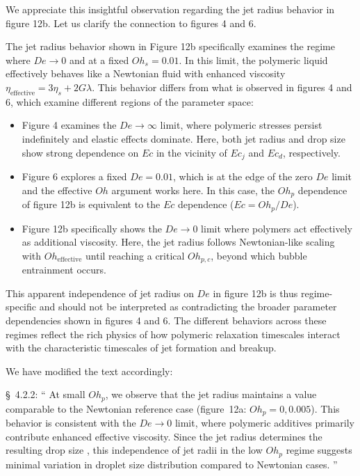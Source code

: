 \documentclass[]{article}
\newcommand{\oo}{\color{magenta} \normalfont}
\newcommand{\bb}{\color{black} \normalfont}
\begin{document}
\begin{enumerate}
      We appreciate this insightful observation regarding the jet radius behavior in figure 12b. Let us clarify the connection to figures 4 and 6.

      The jet radius behavior shown in Figure 12b specifically examines the regime where $De \to 0$ and at a fixed $Oh_s = 0.01$. In this limit, the polymeric liquid effectively behaves like a Newtonian fluid with enhanced viscosity $\eta_{\text{effective}} = 3\eta_s + 2G\lambda$. This behavior differs from what is observed in figures 4 and 6, which examine different regions of the parameter space:

      \begin{itemize}
      	\item Figure 4 examines the $De \to \infty$ limit, where polymeric stresses persist indefinitely and elastic effects dominate. Here, both jet radius and drop size show strong dependence on $Ec$ in the vicinity of $Ec_j$ and $Ec_d$, respectively.
      	\item Figure 6 explores a fixed $De = 0.01$, which is at the edge of the zero $De$ limit and the effective $Oh$ argument works here. In this case, the $Oh_p$ dependence of figure 12b is equivalent to the $Ec$ dependence ($Ec = Oh_p/De$).
      	\item Figure 12b specifically shows the $De \to 0$ limit where polymers act effectively as additional viscosity. Here, the jet radius follows Newtonian-like scaling with $Oh_{\text{effective}}$ until reaching a critical $Oh_{p,c}$, beyond which bubble entrainment occurs.
      \end{itemize}

      This apparent independence of jet radius on $De$ in figure 12b is thus regime-specific and should not be interpreted as contradicting the broader parameter dependencies shown in figures 4 and 6. The different behaviors across these regimes reflect the rich physics of how polymeric relaxation timescales interact with the characteristic timescales of jet formation and breakup.

      We have modified the text accordingly:

      \S~4.2.2: ``\oo At small $Oh_p$, we observe that the jet radius maintains a value comparable to the Newtonian reference case (figure~12a: $Oh_p = 0, 0.005$). This behavior is consistent with the $De \to 0$ limit, where polymeric additives primarily contribute enhanced effective viscosity. Since the jet radius determines the resulting drop size \citep{ganan2017revision,blanco2020sea}, this independence of jet radii in the low $Oh_p$ regime suggests minimal variation in droplet size distribution compared to Newtonian cases.\bb''



\end{enumerate}
\end{document}
